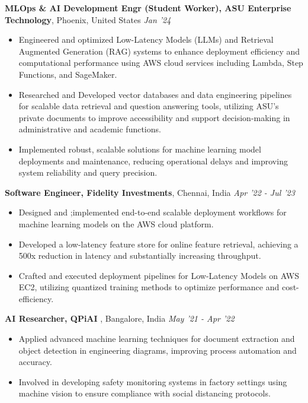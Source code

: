 \documentclass[11pt,a3]{article}
\begin{document}
{\begin{flushleft}
        \vspace{1.5mm}
        \textbf{\large MLOps \& AI Development Engr (Student Worker), ASU Enterprise Technology},  \large Phoenix, United States \hfill \textit{\large Jan '24}	\\
		\begin{itemize}
            \item Engineered and optimized Low-Latency Models (LLMs) and Retrieval Augmented Generation (RAG) systems to enhance deployment efficiency and computational performance using AWS cloud services including Lambda, Step Functions, and SageMaker.
            \item Researched and Developed vector databases and data engineering pipelines for scalable data retrieval and question answering tools, utilizing ASU’s private documents to improve accessibility and support decision-making in administrative and academic functions.
            \item Implemented robust, scalable solutions for machine learning model deployments and maintenance, reducing operational delays and improving system reliability and query precision.
        \end{itemize}	
        \vspace{0.5mm}
        \textbf{\large Software Engineer, Fidelity Investments},  \large Chennai, India \hfill \textit{\large Apr '22 - Jul '23}	\\
		\begin{itemize}
            \item Designed and ;implemented end-to-end scalable deployment workflows for machine learning models on the AWS cloud platform.  
             \item Developed a low-latency feature store for online feature retrieval, achieving a 500x reduction in latency and substantially increasing throughput.
             \item Crafted and executed deployment pipelines for Low-Latency Models on AWS EC2, utilizing quantized training methods to optimize performance and cost-efficiency. 
		\end{itemize}	
  
		\textbf{\large AI Researcher, QPiAI }, \large Bangalore, India \hfill \textit{\large May '21 - Apr '22}	\\
		\begin{itemize}
			  
			\item Applied advanced machine learning techniques for document extraction and object detection in engineering diagrams, improving process automation and accuracy.
			\item Involved in developing safety monitoring systems in factory settings using machine vision to ensure compliance with social distancing protocols.
        \end{itemize}		


\end{flushleft}}
\end{document}
